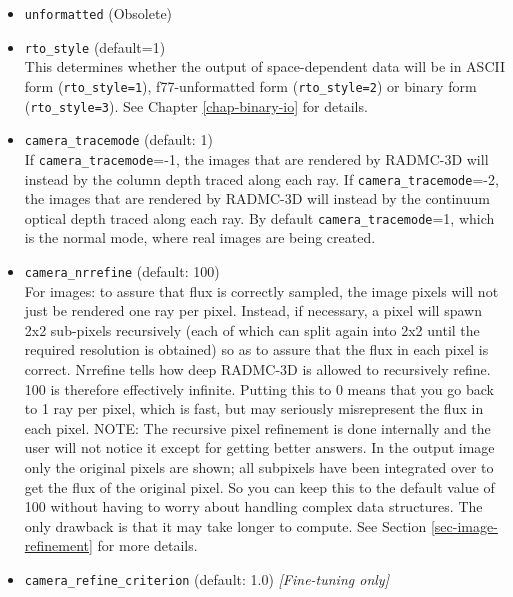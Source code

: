 \documentclass{report}
\begin{document}
\begin{itemize}
{    scattering\_mode\_max}. If you set {\small\tt scattering\_mode\_max=0}
  then no matter what opacity files you have, scattering will not be treated.
  If you set {\small\tt scattering\_mode\_max=1}, then no matter what opacity
  files you have, scattering will be treated in an isotropic way.
\item {\small\tt unformatted} (Obsolete)\\
\item {\small\tt rto\_style} (default=1)\\
  This determines whether the output of space-dependent data will be
  in ASCII form ({\small\tt rto\_style=1}), f77-unformatted form
  ({\small\tt rto\_style=2}) or binary form ({\small\tt rto\_style=3}).
  See Chapter \ref{chap-binary-io} for details.
\item {\small\tt camera\_tracemode} (default: 1)\\
  If {\small\tt camera\_tracemode}=-1, the images that are rendered by 
  RADMC-3D will instead by the column depth traced along each ray.
  If {\small\tt camera\_tracemode}=-2, the images that are rendered by 
  RADMC-3D will instead by the continuum optical depth traced along each ray.
  By default {\small\tt camera\_tracemode}=1, which is the normal mode,
  where real images are being created.
\item {\small\tt camera\_nrrefine} (default: 100)\\
  For images: to assure that flux is correctly sampled, the image pixels
  will not just be rendered one ray per pixel. Instead, if necessary,
  a pixel will spawn 2x2 sub-pixels recursively (each of which can 
  split again into 2x2 until the required resolution is obtained) so
  as to assure that the flux in each pixel is correct. Nrrefine tells
  how deep RADMC-3D is allowed to recursively refine. 100 is therefore
  effectively infinite. Putting this to 0 means that you go back to
  1 ray per pixel, which is fast, but may seriously misrepresent the flux
  in each pixel. NOTE: The recursive pixel refinement is done internally
  and the user will not notice it except for getting better answers. In 
  the output image only the original pixels are shown; all subpixels have
  been integrated over to get the flux of the original pixel. So you can
  keep this to the default value of 100 without having to worry about 
  handling complex data structures. The only drawback is that it may take
  longer to compute. See Section \ref{sec-image-refinement} for more details.
\item {\small\tt camera\_refine\_criterion} (default: 1.0) {\em [Fine-tuning only]}\\

\end{itemize}
\end{document}

